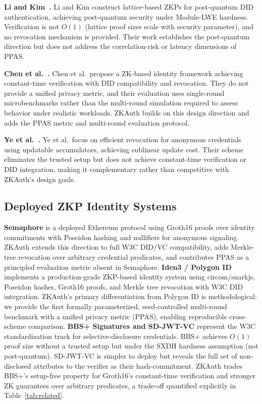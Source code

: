 \documentclass[journal,12pt,onecolumn]{IEEEtran}
\begin{document}
\textbf{Li and Kim~\cite{li2024anonymous}.}
Li and Kim construct lattice-based ZKPs for post-quantum DID
authentication, achieving post-quantum security under Module-LWE
hardness. Verification is not $O(1)$ (lattice proof sizes scale with
security parameter), and no revocation mechanism is provided. Their
work establishes the post-quantum direction but does not address the
correlation-risk or latency dimensions of PPAS.

\textbf{Chen et al.~\cite{chen2024zkid}.}
Chen et al.\ propose a ZK-based identity framework achieving
constant-time verification with DID compatibility and revocation. They
do not provide a unified privacy metric, and their evaluation uses
single-round microbenchmarks rather than the multi-round simulation
required to assess behavior under realistic workloads. ZKAuth builds
on this design direction and adds the PPAS metric and multi-round
evaluation protocol.

\textbf{Ye et al.~\cite{ye2024revocation}.}
Ye et al.\ focus on efficient revocation for anonymous credentials
using updatable accumulators, achieving sublinear update cost. Their
scheme eliminates the trusted setup but does not achieve constant-time
verification or DID integration, making it complementary rather than
competitive with ZKAuth's design goals.

\subsection{Deployed ZKP Identity Systems}

\textbf{Semaphore} \cite{gurkan2021semaphore} is a deployed Ethereum
protocol using Groth16 proofs over identity commitments with Poseidon
hashing and nullifiers for anonymous signaling. ZKAuth extends this
direction to full W3C DID/VC compatibility, adds Merkle-tree revocation
over arbitrary credential predicates, and contributes PPAS as a
principled evaluation metric absent in Semaphore.
\textbf{Iden3 / Polygon ID} \cite{polygonid2023} implements a
production-grade ZKP-based identity system using circom/snarkjs,
Poseidon hashes, Groth16 proofs, and Merkle tree revocation with W3C
DID integration. ZKAuth's primary differentiation from Polygon ID is
methodological: we provide the first formally parameterized,
seed-controlled multi-round benchmark with a unified privacy metric
(PPAS), enabling reproducible cross-scheme comparison.
\textbf{BBS+ Signatures and SD-JWT-VC} \cite{looker2023bbs,
w3c_sdjwt_2024} represent the W3C standardization track for
selective-disclosure credentials. BBS+ achieves $O(1)$ proof size
without a trusted setup but under the SXDH hardness assumption
(not post-quantum). SD-JWT-VC is simpler to deploy but reveals the
full set of non-disclosed attributes to the verifier as their
hash-commitment. ZKAuth trades BBS+'s setup-free property for Groth16's
constant-time verification and stronger ZK guarantees over arbitrary
predicates, a trade-off quantified explicitly in Table~\ref{tab:related}.
\end{document}
